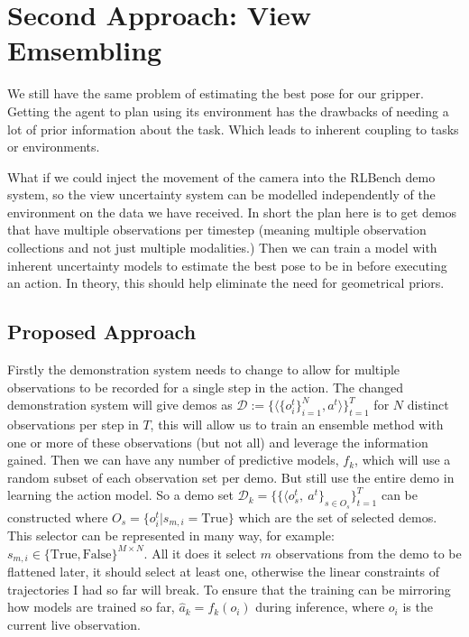 \section{Second Approach: View Emsembling}
We still have the same problem of estimating the best pose for our gripper. Getting the agent to plan using its environment has the drawbacks of needing a lot of prior information about the task. Which leads to inherent coupling to tasks or environments.

What if we could inject the movement of the camera into the RLBench demo system, so the view uncertainty system can be modelled independently of the environment on the data we have received. In short the plan here is to get demos that have multiple observations per timestep (meaning multiple observation collections and not just multiple modalities.) Then we can train a model with inherent uncertainty models to estimate the best pose to be in before executing an action. In theory, this should help eliminate the need for geometrical priors.

\subsection{Proposed Approach}
Firstly the demonstration system needs to change to allow for multiple observations to be recorded for a single step in the action. The changed demonstration system will give demos as \( \mathcal{D} := \{\langle \{o_i^t\}_{i = 1}^{N}, a^t\rangle\}_{t = 1}^{T}\) for $N$ distinct observations per step in $T$, this will allow us to train an ensemble method with one or more of these observations (but not all) and leverage the information gained. Then we can have any number of predictive models, $f_k$, which will use a random subset of each observation set per demo. But still use the entire demo in learning the action model. So a demo set \(\mathcal{D}_k = \{\{ \langle o_s^t, ~a^t \}_{s \in O_s} \}_{t = 1}^T\) can be constructed where \(O_s = \{o_i^t | s_{m, i} = \text{True}\}\) which are the set of selected demos. This selector can be represented in many way, for example: \(s_{m, i} \in \{\text{True}, \text{False}\}^{M \times N}\). All it does it select $m$ observations from the demo to be flattened later, it should select at least one, otherwise the linear constraints of trajectories I had so far will break.
To ensure that the training can be mirroring how models are trained so far, \(\hat{a}_k = f_k\left(o_i\right)\) during inference, where $o_i$ is the current live observation.

